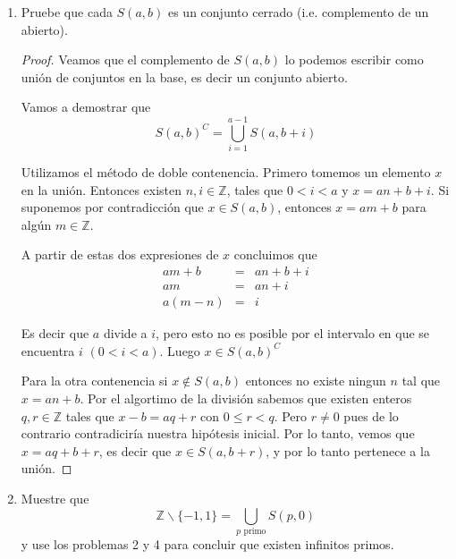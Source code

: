 \documentclass[letter,twoside,12pt]{article}
\begin{document}
\begin{enumerate}[label=\textbf{\arabic*}.]
\begin{proof}
Lo primero es cierto, porque $x=0*m+x$ y $y=0*m+y$, es decir, $x \in S(m,x)$ y $y \in S(m,y)$.

Para la otra proposici\'on, supongase por contradicci\'on que no son disyuntos. Entonces tomamos $z$ en la intersecci\'on y existen $p,q \in \mathbb{Z}$ tales que $z=mp+x=mq+y$. De aqu\'i deducimos que $m(p-q)=y-x$, es decir que $m$ divide a $y-x$. Pero tenemos que $0<y-x<m$, por lo cual esto es una contradicci\'on.
\end{proof}
\item Pruebe que cada $S(a,b)$ es un conjunto cerrado (i.e. complemento de un abierto).

\begin{proof}
Veamos que el complemento de $S(a,b)$ lo podemos escribir como uni\'on de conjuntos en la base, es decir un conjunto abierto.

Vamos a demostrar que
\begin{equation}
S(a,b)^C=\bigcup_{i=1}^{a-1} S(a,b+i) \nonumber
\end{equation}

Utilizamos el m\'etodo de doble contenencia. Primero tomemos un elemento $x$ en la uni\'on. Entonces existen $n,i \in \mathbb{Z}$, tales que $0<i<a$ y $x=an+b+i$. Si suponemos por contradicci\'on que $x \in S(a,b)$, entonces $x=am+b$ para alg\'un $m \in \mathbb{Z}$.

A partir de estas dos expresiones de $x$ concluimos que 
\begin{eqnarray}
am+b&=&an+b+i\nonumber
\\ am&=&an+i\nonumber
\\ a(m-n)&=&i\nonumber
\end{eqnarray}

Es decir que $a$ divide a $i$, pero esto no es posible por el intervalo en que se encuentra $i$ $(0<i<a)$. Luego $x \in S(a,b)^C$

Para la otra contenencia si $x \not \in S(a,b)$ entonces no existe ningun $n$ tal que $x=an+b$. Por el algortimo de la divisi\'on sabemos que existen enteros $q,r \in \mathbb{Z}$ tales que $x-b=aq+r$ con $0 \leq r < q$. Pero $r \not =0$ pues de lo contrario contradicir\'ia nuestra hip\'otesis inicial. Por lo tanto, vemos que $x=aq+b+r$, es decir que $x \in S(a,b+r)$, y por lo tanto pertenece a la uni\'on.
\end{proof}

\item Muestre que
\begin{equation}
\mathbb{Z}\backslash\{-1,1\} = \bigcup_{p \text{ primo}} S(p,0) \nonumber
\end{equation}
y use los problemas 2 y 4 para concluir que existen infinitos primos.


\end{enumerate}
\end{document}
